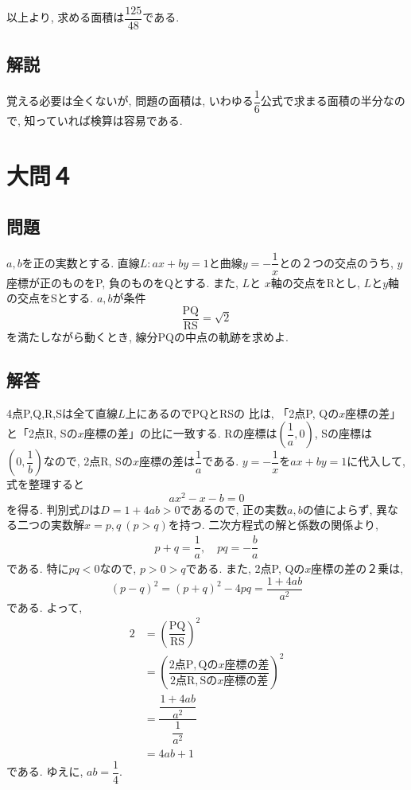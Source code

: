 \documentclass[dvipdfmx,a4paper]{jsarticle}
\begin{document}
    以上より, 求める面積は$\dfrac{125}{48}$である. 

    \subsection{解説}
    覚える必要は全くないが, 問題の面積は, いわゆる$\dfrac{1}{6}$公式で求まる面積の半分なので, 
    知っていれば検算は容易である. 

    \section{大問４}
    \subsection{問題}
    $a,b$を正の実数とする. 直線$L: ax+by=1$と曲線$y=-\dfrac{1}{x}$との２つの交点のうち, 
    $y$座標が正のものをP, 負のものをQとする. また, $L$と
    $x$軸の交点をRとし, $L$と$y$軸の交点をSとする. $a,b$が条件
    \begin{equation*}\mathrm{
        \dfrac{PQ}{RS} = \sqrt{2}
    }
    \end{equation*}
    を満たしながら動くとき, 線分PQの中点の軌跡を求めよ. 

    \subsection{解答}
    4点P,Q,R,Sは全て直線$L$上にあるのでPQとRSの
    比は, 「2点P, Qの$x$座標の差」と「2点R, Sの$x$座標の差」の比に一致する. 
    Rの座標は$\left(\dfrac{1}{a},0\right)$, 
    Sの座標は$\left(0,\dfrac{1}{b}\right)$なので, 
    2点R, Sの$x$座標の差は$\dfrac{1}{a}$である. 
    $y=-\dfrac{1}{x}$を$ax+by=1$に代入して, 式を整理すると
    \begin{equation*}
        ax^2-x -b =0
    \end{equation*}
    を得る. 判別式$D$は$D=1 + 4ab >0$であるので, 正の実数$a,b$の値によらず, 
    異なる二つの実数解$x=p,q \ (p>q)$を持つ. 
    二次方程式の解と係数の関係より, 
    \begin{align*}
        p + q = \dfrac{1}{a}, \quad pq = -\dfrac{b}{a}
    \end{align*}
    である. 特に$pq<0$なので, $p>0>q$である. また, 2点P, Qの$x$座標の差の２乗は, 
    \[
        (p-q)^2 = (p+q)^2 - 4pq =\dfrac{1+4ab}{a^2}
    \]
    である. よって, 
    \begin{align*}
        2 &= \left(\dfrac{\mathrm{PQ}}{\mathrm{RS}} \right)^2 \\
        &= \left(\dfrac{\mathrm{2点P, Qの}x\mathrm{座標の差}}{\mathrm{2点R, Sの}x\mathrm{座標の差}} \right)^2 \\
        &= \dfrac{\dfrac{1+4ab}{a^2}}{\dfrac{1}{a^2}} \\
        &= 4ab + 1
    \end{align*}
    である. ゆえに, $ab=\dfrac{1}{4}$. 
\end{document}
